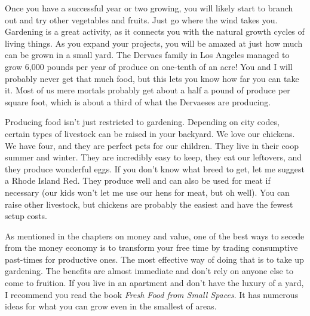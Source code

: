 Once you have a successful year or two growing, you will likely start to
branch out and try other vegetables and fruits. Just go where the wind
takes you. Gardening is a great activity, as it connects you with the
natural growth cycles of living things. As you expand your projects,
you will be amazed at just how much can be grown in a small yard. The
Dervaes family in Los Angeles managed to grow 6,000 pounds per year of
produce on one-tenth of an acre!  You and I will probably never get
that much food, but this lets you know how far you can take it. Most of
us mere mortals probably get about a half a pound of produce per square
foot, which is about a third of what
the Dervaeses are
producing.

Producing food isn’t just restricted to gardening. Depending on city
codes, certain types of livestock can be raised in your backyard. We
love our chickens. We have four, and they are perfect pets for our
children. They live in
their coop summer and winter. They are incredibly easy to keep, they
eat our leftovers, and they produce wonderful eggs. If you don’t know
what breed to get, let me suggest a Rhode Island Red. They produce well
and can also be used for meat if necessary (our kids won’t let me use
our hens for meat, but oh well). You can raise other livestock, but
chickens are probably the easiest and have the fewest setup costs.

As mentioned in the chapters on money and value, one of the best ways to
secede from the money economy is to transform your free time by trading
consumptive past-times for productive ones. The most effective way of
doing that is to take up gardening. The benefits are almost immediate
and don’t rely on anyone else to come to fruition. If you live in an
apartment and don’t have the luxury of a yard, I recommend you read the
book \textit{Fresh Food from Small Spaces}. It has numerous ideas for
what you can grow even in the smallest of areas.

